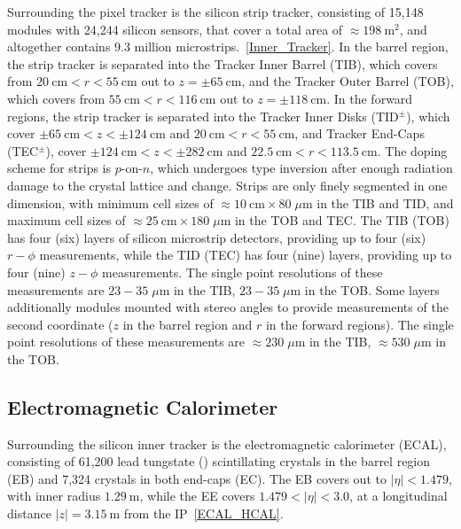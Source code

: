 Surrounding the pixel tracker is the silicon strip tracker, consisting of 15,148 modules with 24,244 silicon sensors, that cover a total area of $\approx \SI{198}{\m \squared}$, and altogether contains 9.3 million microstrips.~\ref{Inner_Tracker}.
In the barrel region, the strip tracker is separated into the Tracker Inner Barrel (TIB), which covers from $\SI{20}{\cm} < r < \SI{55}{\cm}$ out to $z = \pm \SI{65}{\cm}$, and the Tracker Outer Barrel (TOB), which covers from $\SI{55}{\cm} < r < \SI{116}{\cm}$ out to $z = \pm \SI{118}{\cm}$.
In the forward regions, the strip tracker is separated into the Tracker Inner Disks (TID$^\pm$), which cover $\pm\SI{65}{\cm} < z < \pm\SI{124}{\cm}$ and $\SI{20}{\cm} < r < \SI{55}{\cm}$, and Tracker End-Caps (TEC$^\pm$), cover $\pm\SI{124}{\cm} < z < \pm\SI{282}{\cm}$ and $\SI{22.5}{\cm} < r < \SI{113.5}{\cm}$.
The doping scheme for strips is $p$-on-$n$, which undergoes type inversion after enough radiation damage to the crystal lattice and change.
Strips are only finely segmented in one dimension, with minimum cell sizes of  $\approx \SI{10}{\cm} \times 80 \; \mu \si{\m}$ in the TIB and TID, and maximum cell sizes of $\approx \SI{25}{\cm} \times 180 \; \mu \si{\m}$ in the TOB and TEC.
The TIB (TOB) has four (six) layers of silicon microstrip detectors, providing up to four (six) $r-\phi$ measurements, while the TID (TEC) has four (nine) layers, providing up to four (nine) $z-\phi$ measurements.
The single point resolutions of these measurements are $23-35 \; \mu \si{\m}$ in the TIB, $23-35 \; \mu \si{\m}$ in the TOB.
Some layers additionally modules mounted with stereo angles to provide measurements of the second coordinate ($z$ in the barrel region and $r$ in the forward regions).
The single point resolutions of these measurements are $\approx 230 \; \mu \si{\m}$ in the TIB, $\approx 530 \; \mu \si{\m}$ in the TOB.

\subsection{Electromagnetic Calorimeter}
Surrounding the silicon inner tracker is the electromagnetic calorimeter (ECAL), consisting of 61,200 lead tungstate () scintillating crystals in the barrel region (EB) and 7,324 crystals in both end-caps (EC).
The EB covers out to $\vert \eta \vert < 1.479$, with inner radius $\SI{1.29}{\m}$, while the EE covers $1.479 < \vert \eta \vert < 3.0$, at a longitudinal distance $\vert z \vert = \SI{3.15}{\m}$ from the IP~\ref{ECAL_HCAL}.

